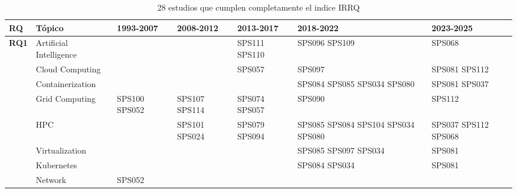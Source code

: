 \begin{table*}[htbp]
	\centering
	\caption{28 estudios que cumplen completamente el indice IRRQ}
	\label{table:highest_IRRQ}
	\renewcommand{\arraystretch}{1.2}
	\setlength{\tabcolsep}{6pt}
	\begin{tabularx}{\textwidth}{p{0.8cm}p{2.5cm}>{\raggedright\arraybackslash}X>{\raggedright\arraybackslash}X>{\raggedright\arraybackslash}X>{\raggedright\arraybackslash}X>{\raggedright\arraybackslash}X}
		\toprule
		\textbf{RQ}                           & \textbf{Tópico}         & \textbf{1993-2007} 	& \textbf{2008-2012} 	& \textbf{2013-2017} 			& \textbf{2018-2022} 								& \textbf{2023-2025} 			\\
		\midrule
		\multirow{12}{*}[0em]{\textbf{RQ1}}   & Artificial Intelligence &        			 	&                    	& SPS111 SPS110					& SPS096 SPS109										& SPS068             			\\
		\addlinespace[0.3em]
											  & Cloud Computing         &        			 	&					 	& SPS057						& SPS097											& SPS081 SPS112      			\\
		\addlinespace[0.3em]
		                                      & Containerization        &        			 	&                    	& 								& SPS084 SPS085 SPS034 SPS080 						& SPS081 SPS037		 			\\
		\addlinespace[0.3em]
		                                      & Grid Computing          & SPS100 SPS052 		& SPS107 SPS114			& SPS074 SPS057					& SPS090             								& SPS112             			\\
		\addlinespace[0.3em]
		                                      & HPC                     &        			 	& SPS101 SPS024 		& SPS079 SPS094     			& SPS085 SPS084 SPS104 SPS034 SPS080				& SPS037 SPS112 SPS068 			\\
		\addlinespace[0.3em]
		                                      & Virtualization          &        			 	& 		             	&  			   					& SPS085 SPS097 SPS034                 				& SPS081             			\\
		\addlinespace[0.3em]
		                                      & Kubernetes              &        			 	&                    	&                    			& SPS084 SPS034      								& SPS081             			\\
		\addlinespace[0.3em]
		                                      & Network                 & SPS052      			&                    	&              					&                    								&                    			\\

\end{tabularx}
\end{table*}

